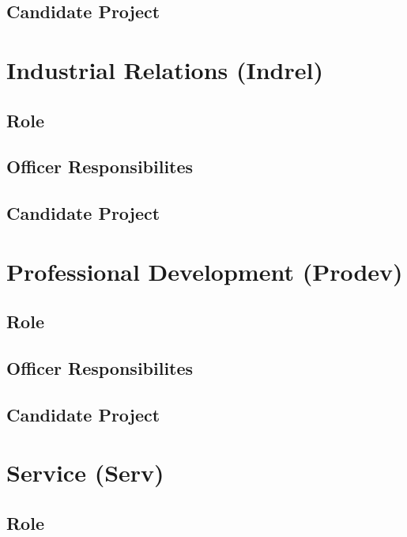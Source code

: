 \documentclass[11pt, article, oneside]{memoir}
\begin{document}
    \subsection{Candidate Project}

    \bigbreak

    
    \section{Industrial Relations (Indrel)}
    \subsection{Role}

    \subsection{Officer Responsibilites}

    \subsection{Candidate Project}

    \bigbreak

    
    \section{Professional Development (Prodev)}
    \subsection{Role}

    \subsection{Officer Responsibilites}

    \subsection{Candidate Project}


    \bigbreak

    
    \section{Service (Serv)}
    \subsection{Role}
\end{document}
